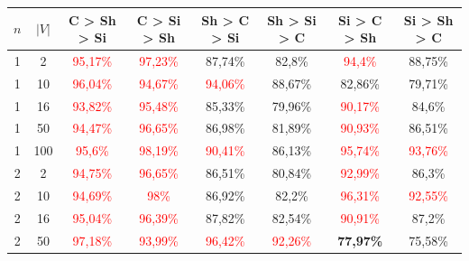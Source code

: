 \begin{table}[ht]
    \centering
    \begin{tabular}{cc|c|c|c|c|c|c}
        \toprule
        $n$ & $|V|$ & \textbf{C > Sh > Si}              & \textbf{C > Si > Sh}              & \textbf{Sh > C > Si}     & \textbf{Sh > Si > C}     & \textbf{Si > C > Sh}     & \textbf{Si > Sh > C}     \\\midrule
        {1} & {2}   & \textcolor{red}{95,17\%}          & \textcolor{red}{97,23\%}          & {87,74\%}                & {82,8\%}                 & \textcolor{red}{94,4\%}  & {88,75\%}                \\
        {1} & {10}  & \textcolor{red}{96,04\%}          & \textcolor{red}{94,67\%}          & \textcolor{red}{94,06\%} & {88,67\%}                & {82,86\%}                & {79,71\%}                \\
        {1} & {16}  & \textcolor{red}{93,82\%}          & \textcolor{red}{95,48\%}          & {85,33\%}                & {79,96\%}                & \textcolor{red}{90,17\%} & {84,6\%}                 \\
        {1} & {50}  & \textcolor{red}{94,47\%}          & \textcolor{red}{96,65\%}          & {86,98\%}                & {81,89\%}                & \textcolor{red}{90,93\%} & {86,51\%}                \\
        {1} & {100} & \textcolor{red}{95,6\%}           & \textcolor{red}{98,19\%}          & \textcolor{red}{90,41\%} & {86,13\%}                & \textcolor{red}{95,74\%} & \textcolor{red}{93,76\%} \\
        {2} & {2}   & \textcolor{red}{94,75\%}          & \textcolor{red}{96,65\%}          & {86,51\%}                & {80,84\%}                & \textcolor{red}{92,99\%} & {86,3\%}                 \\
        {2} & {10}  & \textcolor{red}{94,69\%}          & \textcolor{red}{98\%}             & {86,92\%}                & {82,2\%}                 & \textcolor{red}{96,31\%} & \textcolor{red}{92,55\%} \\
        {2} & {16}  & \textcolor{red}{95,04\%}          & \textcolor{red}{96,39\%}          & {87,82\%}                & {82,54\%}                & \textcolor{red}{90,91\%} & {87,2\%}                 \\
        {2} & {50}  & \textcolor{red}{97,18\%}          & \textcolor{red}{93,99\%}          & \textcolor{red}{96,42\%} & \textcolor{red}{92,26\%} & \textbf{77,97\%}         & {75,58\%}                \\

\end{tabular}
\end{table}
